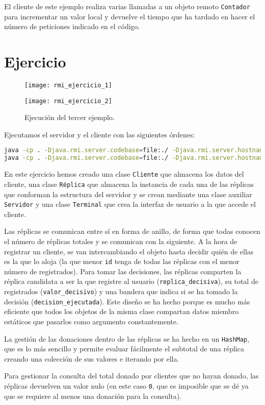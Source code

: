El cliente de este ejemplo realiza varias llamadas a un objeto remoto \texttt{Contador} para incrementar un valor local y devuelve el tiempo que ha tardado en hacer el número de peticiones indicado en el código.

\section{Ejercicio}

\begin{figure}[!ht]
\begin{center}
	\texttt{[image: rmi\_ejercicio\_1]}

	\texttt{[image: rmi\_ejercicio\_2]}
\end{center}
\caption{Ejecución del tercer ejemplo.}
\end{figure}

Ejecutamos el servidor y el cliente con las siguientes órdenes:

\begin{lstlisting}[language=sh]
java -cp . -Djava.rmi.server.codebase=file:./ -Djava.rmi.server.hostname=localhost      -Djava.security.policy=server.policy ejercicio.Servidor
java -cp . -Djava.rmi.server.codebase=file:./ -Djava.rmi.server.hostname=localhost      -Djava.security.policy=server.policy ejercicio.Terminal
\end{lstlisting}

En este ejercicio hemos creado una clase \texttt{Cliente} que almacena los datos del cliente, una clase \texttt{Réplica} que almacena la instancia de cada una de las réplicas que conforman la estructura del servidor y se crean mediante una clase auxiliar \texttt{Servidor} y una clase \texttt{Terminal} que crea la interfaz de usuario a la que accede el cliente.

Las réplicas se comunican entre sí en forma de anillo, de forma que todas conocen el número de réplicas totales y se comunican con la siguiente.
A la hora de registrar un cliente, se van intercambiando el objeto hasta decidir quién de ellas es la que lo aloja (la que menor \texttt{id} tenga de todas las réplicas con el menor número de registrados).
Para tomar las decisiones, las réplicas comparten la réplica candidata a ser la que registre al usuario (\texttt{replica\_decisiva}), su total de registrados (\texttt{valor\_decisivo}) y una bandera que indica si se ha tomado la decisión  (\texttt{decision\_ejecutada}).
Este diseño se ha hecho porque es mucho más eficiente que todos los objetos de la misma clase compartan datos miembro estáticos que pasarlos como argumento constantemente.

La gestión de las donaciones dentro de las réplicas se ha hecho en un \texttt{HashMap}, que es lo más sencillo y permite evaluar fácilmente el subtotal de una réplica creando una colección de sus valores e iterando por ella.

Para gestionar la consulta del total donado por clientes que no hayan donado, las réplicas devuelven un valor nulo (en este caso \texttt{0}, que es imposible que se dé ya que se requiere al menos una donación para la consulta).
